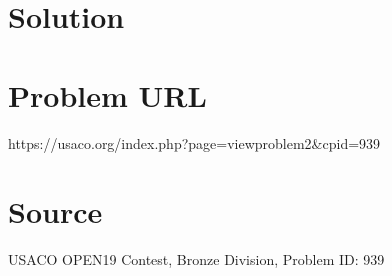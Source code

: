 \documentclass[12pt]{article}
\begin{document}
\section*{Solution}


\section*{Problem URL}
https://usaco.org/index.php?page=viewproblem2&cpid=939

\section*{Source}
USACO OPEN19 Contest, Bronze Division, Problem ID: 939
\end{document}

